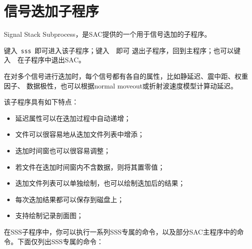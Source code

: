 \section{信号迭加子程序}

Signal Stack Subprocess，是SAC提供的一个用于信号迭加的子程序。

键入~\lstinline{sss}~即可进入该子程序；键入~~即可
退出子程序，回到主程序；也可以键入~~在子程序中退出SAC。

在对多个信号进行迭加时，每个信号都有各自的属性，比如静延迟、震中距、权重因子、
数据极性，也可以根据normal moveout或折射波速度模型计算动延迟。

该子程序具有如下特点：
\begin{itemize}
\item 延迟属性可以在迭加过程中自动递增；
\item 文件可以很容易地从迭加文件列表中增添；
\item 迭加时间窗也可以很容易调整；
\item 若文件在迭加时间窗内不含数据，则将其置零值；
\item 迭加文件列表可以单独绘制，也可以绘制迭加后的结果；
\item 每次迭加结果都可以保存到磁盘上；
\item 支持绘制记录剖面图；
\end{itemize}

在SSS子程序中，你可以执行一系列SSS专属的命令，以及部分SAC主程序中的命令。下面仅列出SSS专属的命令：


